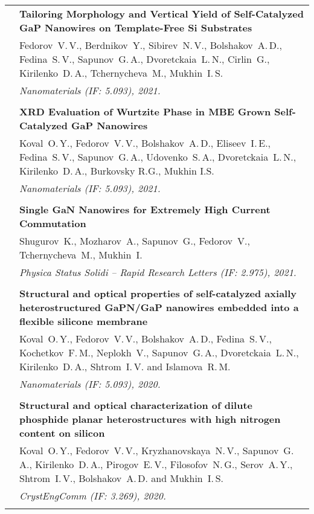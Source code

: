 \documentclass[letterpaper, 11pt]{article}
\begin{document}
\begin{longtable}{p{1.3in}p{4.8in}}
        & \textbf{Tailoring Morphology and Vertical Yield of Self-Catalyzed GaP
        Nanowires on Template-Free Si Substrates} \\
        & Fedorov~V.\,V., Berdnikov~Y., Sibirev~N.\,V., Bolshakov~A.\,D.,
        Fedina~S.\,V., Sapunov~G.\,A., Dvoretckaia~L.\,N., Cirlin~G.,
        Kirilenko~D.\,A., Tchernycheva~M., Mukhin~I.\,S. \\
		& \textit{Nanomaterials (IF: 5.093), 2021.}\\
		& \\

        & \textbf{XRD Evaluation of Wurtzite Phase in MBE Grown Self-Catalyzed
        GaP Nanowires} \\
        & Koval~O.\,Y., Fedorov~V.\,V., Bolshakov~A.\,D., Eliseev~I.\,E.,
        Fedina~S.\,V., Sapunov~G.\,A., Udovenko~S.\,A., Dvoretckaia~L.\,N.,
        Kirilenko~D.\,A., Burkovsky R.G., Mukhin I.S. \\
        & \textit{Nanomaterials (IF: 5.093), 2021.}\\
		& \\

        & \textbf{Single GaN Nanowires for Extremely High Current Commutation}
        \\
        & Shugurov~K., Mozharov~A., Sapunov~G., Fedorov~V., Tchernycheva~M.,
        Mukhin~I. \\
        & \textit{Physica Status Solidi -- Rapid Research Letters (IF: 2.975), 2021.}\\
		& \\

        & \textbf{Structural and optical properties of self-catalyzed axially
        heterostructured GaPN/GaP nanowires embedded into a flexible silicone
        membrane} \\
        & Koval~O.\,Y., Fedorov~V.\,V., Bolshakov~A.\,D., Fedina~S.\,V.,
        Kochetkov~F.\,M., Neplokh~V., Sapunov~G.\,A., Dvoretckaia~L.\,N.,
        Kirilenko~D.\,A., Shtrom~I.\,V. and Islamova~R.\,M. \\
        & \textit{Nanomaterials (IF: 5.093), 2020.}\\
		& \\
		
        & \textbf{Structural and optical characterization of dilute phosphide
        planar heterostructures with high nitrogen content on silicon} \\
        & Koval~O.\,Y., Fedorov~V.\,V., Kryzhanovskaya~N.\,V., Sapunov~G.\,A.,
        Kirilenko~D.\,A., Pirogov~E.\,V., Filosofov~N.\,G., Serov~A.\,Y.,
        Shtrom~I.\,V., Bolshakov~A.\,D. and Mukhin~I.\,S. \\
        & \textit{CrystEngComm (IF: 3.269), 2020.}\\
		& \\
		

\end{longtable}
\end{document}
